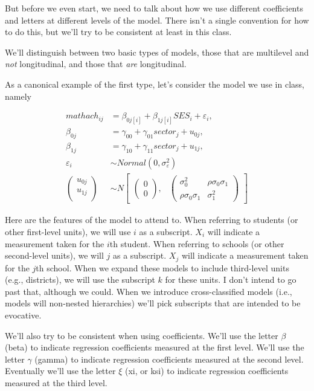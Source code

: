 \documentclass[
  letterpaper,
  DIV=11,
  numbers=noendperiod]{scrreprt}
\begin{document}
But before we even start, we need to talk about how we use different
coefficients and letters at different levels of the model. There isn't a
single convention for how to do this, but we'll try to be consistent at
least in this class.

We'll distinguish between two basic types of models, those that are
multilevel and \emph{not} longitudinal, and those that \emph{are}
longitudinal.

As a canonical example of the first type, let's consider the model we
use in class, namely

\[\begin{aligned}
mathach_{ij} &= \beta_{0j[i]} + \beta_{1j[i]}SES_i + \varepsilon_i, \\
\beta_{0j} &= \gamma_{00} + \gamma_{01}sector_j + u_{0j},\\
\beta_{1j} &= \gamma_{10} + \gamma_{11}sector_j + u_{1j},\\
\varepsilon_i &\sim Normal(0, \sigma^2_\varepsilon) \\
\begin{pmatrix}
u_{0j}\\
u_{1j}\\
\end{pmatrix} &\sim  N
\begin{bmatrix}
\begin{pmatrix}
0\\
0
\end{pmatrix}\!\!,&
\begin{pmatrix}
\sigma^2_0 & \rho\sigma_0\sigma_1\\
\rho\sigma_0\sigma_1 & \sigma^2_1
\end{pmatrix}
\end{bmatrix}
\end{aligned}\]

Here are the features of the model to attend to. When referring to
students (or other first-level units), we will use \(i\) as a subscript.
\(X_i\) will indicate a measurement taken for the \(i\)th student. When
referring to schools (or other second-level units), we will \(j\) as a
subscript. \(X_j\) will indicate a measurement taken for the \(j\)th
school. When we expand these models to include third-level units (e.g.,
districts), we will use the subscript \(k\) for these units. I don't
intend to go past that, although we could. When we introduce
cross-classified models (i.e., models will non-nested hierarchies) we'll
pick subscripts that are intended to be evocative.

We'll also try to be consistent when using coefficients. We'll use the
letter \(\beta\) (beta) to indicate regression coefficients measured at
the first level. We'll use the letter \(\gamma\) (gamma) to indicate
regression coefficients measured at the second level. Eventually we'll
use the letter \(\xi\) (xi, or ksi) to indicate regression coefficients
measured at the third level.
\end{document}
